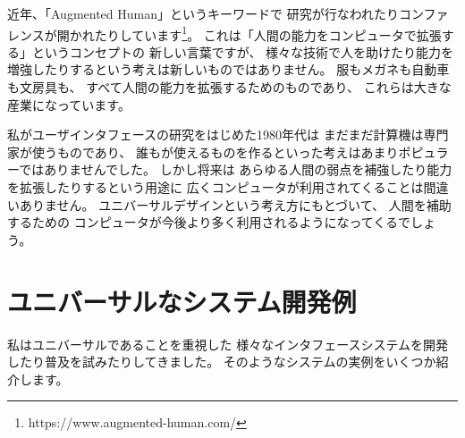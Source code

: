 \documentclass[topics]{compsoft} %
\begin{document}



近年、「Augmented Human」というキーワードで
研究が行なわれたりコンファレンスが開かれたりしています\footnote{
  \textsf{https:{\slash}{\slash}www.augmented-human.com{\slash}}
}。
これは「人間の能力をコンピュータで拡張する」というコンセプトの
新しい言葉ですが、
様々な技術で人を助けたり能力を増強したりするという考えは新しいものではありません。
服もメガネも自動車も文房具も、
すべて人間の能力を拡張するためのものであり、
これらは大きな産業になっています。

私がユーザインタフェースの研究をはじめた1980年代は
まだまだ計算機は専門家が使うものであり、
誰もが使えるものを作るといった考えはあまりポピュラーではありませんでした。
%
しかし将来は
あらゆる人間の弱点を補強したり能力を拡張したりするという用途に
広くコンピュータが利用されてくることは間違いありません。
ユニバーサルデザインという考え方にもとづいて、
人間を補助するための
コンピュータが今後より多く利用されるようになってくるでしょう。

\section{ユニバーサルなシステム開発例}

私はユニバーサルであることを重視した
様々なインタフェースシステムを開発したり普及を試みたりしてきました。
そのようなシステムの実例をいくつか紹介します。
\end{document}
